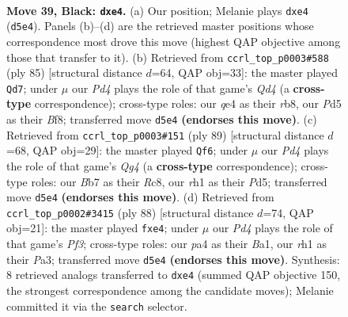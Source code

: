 \documentclass[11pt]{article}
\begin{document}
\clearpage

\begin{figure}[p]\centering
\begin{subfigure}{0.46\textwidth}\centering
\resizebox{\linewidth}{!}{%
\newchessgame
\chessboard[
  setfen={5k2/1b3p1P/qp3n2/1N1p4/P2PQK2/6R1/8/7R b - - 0 39},
  showmover=false,
  pgfstyle=straightmove, color=movearrow, markmove={d5-e4}
]}
\caption{}
\end{subfigure}\hfill
\begin{subfigure}{0.46\textwidth}\centering
\resizebox{\linewidth}{!}{%
\newchessgame
\chessboard[
  setfen={1R3bk1/5pp1/7p/3qQ2P/2r3P1/4PNK1/8/8 b - - 9 43},
  showmover=false,
  pgfstyle=straightmove, color=movearrow, markmove={d5-d7}
]}
\caption{}
\end{subfigure}
\\[4pt]
\begin{subfigure}{0.46\textwidth}\centering
\resizebox{\linewidth}{!}{%
\newchessgame
\chessboard[
  setfen={2r5/5p1k/6p1/3p2q1/3Nn1Q1/P3P2P/5PK1/7R b - - 3 45},
  showmover=false,
  pgfstyle=straightmove, color=movearrow, markmove={g5-f6}
]}
\caption{}
\end{subfigure}\hfill
\begin{subfigure}{0.46\textwidth}\centering
\resizebox{\linewidth}{!}{%
\newchessgame
\chessboard[
  setfen={4r1k1/6p1/3p4/1p6/p1qNn3/P3QP2/7R/B6K w - - 0 45},
  showmover=false,
  pgfstyle=straightmove, color=movearrow, markmove={f3-e4}
]}
\caption{}
\end{subfigure}
\caption{\textbf{Move 39, Black: \texttt{dxe4}.} (a) Our position; Melanie plays \texttt{dxe4} (\texttt{d5e4}). Panels (b)--(d) are the retrieved master positions whose correspondence most drove this move (highest QAP objective among those that transfer to it). (b) Retrieved from \texttt{ccrl\_top\_p0003\#588} (ply 85) [structural distance $d$=64, QAP obj=33]: the master played \texttt{Qd7}; under $\mu$ our \emph{Pd4} plays the role of that game's \emph{Qd4} (a \textbf{cross-type} correspondence); cross-type roles: our \emph{q}e4 as their \emph{r}b8, our \emph{P}d5 as their \emph{B}f8; transferred move \texttt{d5e4} \textbf{(endorses this move)}. (c) Retrieved from \texttt{ccrl\_top\_p0003\#151} (ply 89) [structural distance $d$=68, QAP obj=29]: the master played \texttt{Qf6}; under $\mu$ our \emph{Pd4} plays the role of that game's \emph{Qg4} (a \textbf{cross-type} correspondence); cross-type roles: our \emph{B}b7 as their \emph{R}c8, our \emph{r}h1 as their \emph{P}d5; transferred move \texttt{d5e4} \textbf{(endorses this move)}. (d) Retrieved from \texttt{ccrl\_top\_p0002\#3415} (ply 88) [structural distance $d$=74, QAP obj=21]: the master played \texttt{fxe4}; under $\mu$ our \emph{Pd4} plays the role of that game's \emph{Pf3}; cross-type roles: our \emph{p}a4 as their \emph{B}a1, our \emph{r}h1 as their \emph{P}a3; transferred move \texttt{d5e4} \textbf{(endorses this move)}. Synthesis: 8 retrieved analogs transferred to \texttt{dxe4} (summed QAP objective 150, the strongest correspondence among the candidate moves); Melanie committed it via the \texttt{search} selector.}
\label{fig:thought-m77}
\end{figure}
\end{document}
